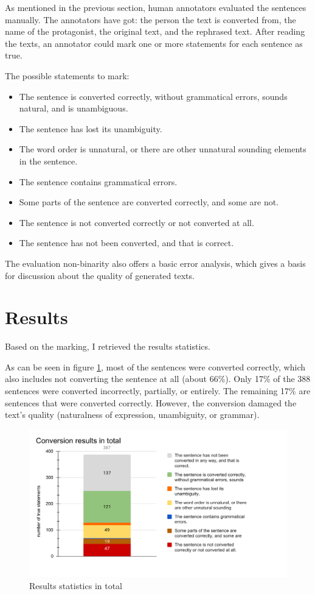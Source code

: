 As mentioned in the previous section, human annotators evaluated the sentences manually. The annotators have got: the person the text is converted from, the name of the protagonist, the original text, and the rephrased text. After reading the texts, an annotator could mark one or more statements for each sentence as true.

The possible statements to mark:

\begin{itemize}
	\item The sentence is converted correctly, without grammatical errors, sounds natural, and is unambiguous.
	\item The sentence has lost its unambiguity.
	\item The word order is unnatural, or there are other unnatural sounding elements in the sentence.
	\item The sentence contains grammatical errors.
	\item Some parts of the sentence are converted correctly, and some are not.
	\item The sentence is not converted correctly or not converted at all.
	\item The sentence has not been converted, and that is correct.
\end{itemize}

The evaluation non-binarity also offers a basic error analysis, which gives a basis for discussion about the quality of generated texts.

\section{Results}

Based on the marking, I retrieved the results statistics.

As can be seen in figure \ref{fig:eval-total}, most of the sentences were converted correctly, which also includes not converting the sentence at all (about 66\%). Only 17\% of the 388 sentences were converted incorrectly, partially, or entirely. The remaining 17\% are sentences that were converted correctly. However, the conversion damaged the text's quality (naturalness of expression, unambiguity, or grammar).

\begin{figure}[!ht]
\includegraphics[width=\textwidth]{data/Eval-Total.pdf}
\caption{Results statistics in total}
\label{fig:eval-total}
\end{figure}

